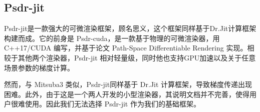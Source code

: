 \subsection{Psdr-jit}

Psdr-jit是一款强大的可微渲染框架，顾名思义，这个框架同样基于Dr.Jit计算框架构建而成。它的前身是 Psdr-cuda，是一款基于物理的可微渲染器，用 C++17/CUDA 编写，并基于论文 Path-Space Differentiable Rendering \cite{PSDR} 实现。相较于其他两个渲染器，Psdr-jit 相对轻量级，同时他也支持GPU加速以及关于任意场景参数的梯度计算。

然而，与 Mitsuba3 类似，Psdr-jit同样基于 Dr.Jit 计算框架，导致梯度传递出现困难。此外，由于这是一个两人开发的小型渲染器，其说明文档并不完善，使得用户很难使用。因此我们无法选择 Psdr-jit 作为我们的基础框架。

\printbibliography
